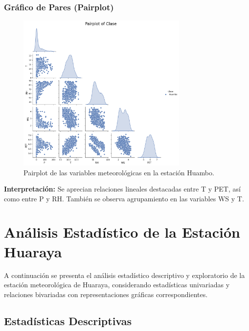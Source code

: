 \subsubsection*{Gráfico de Pares (Pairplot)}
\begin{figure}[htbp]
\centering
\includegraphics[width=0.75\textwidth]{resultados/por_estacion_meteorologica/Huambo/pairplot.png}
\caption{Pairplot de las variables meteorológicas en la estación Huambo.}
\label{fig:huambo_pairplot}
\end{figure}
\textbf{Interpretación:} Se aprecian relaciones lineales destacadas entre T y PET, así como entre P y RH. También se observa agrupamiento en las variables WS y T.



\section{Análisis Estadístico de la Estación Huaraya}

A continuación se presenta el análisis estadístico descriptivo y exploratorio de la estación meteorológica de Huaraya, considerando estadísticas univariadas y relaciones bivariadas con representaciones gráficas correspondientes.

\subsection{Estadísticas Descriptivas}

